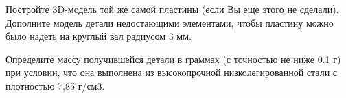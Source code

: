 
Постройте 3D-модель той же самой пластины (если Вы еще этого не сделали).   Дополните модель детали недостающими элементами,  чтобы пластину можно было надеть на круглый вал радиусом 3 мм.


Определите массу получившейся детали в граммах (с точностью не ниже 0.1 г) 
при условии, что она выполнена из высокопрочной низколегированной стали с плотностью 7,85 г/см3.
